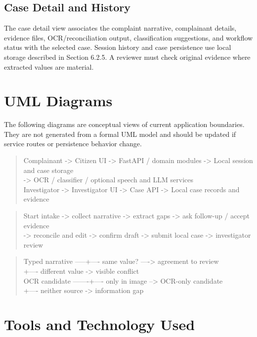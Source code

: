 \documentclass[12pt,a4paper,oneside]{report}
\begin{document}
\subsection{Case Detail and History}
The case detail view associates the complaint narrative, complainant details, evidence files, OCR/reconciliation output, classification suggestions, and workflow status with the selected case. Session history and case persistence use local storage described in Section 6.2.5. A reviewer must check original evidence where extracted values are material.\par\medskip
\section{UML Diagrams}
The following diagrams are conceptual views of current application boundaries. They are not generated from a formal UML model and should be updated if service routes or persistence behavior change.\par\medskip
{}
\begin{quote}\ttfamily\footnotesize Complainant -> Citizen UI -> FastAPI / domain modules -> Local session and case storage\\                         -> OCR / classifier / optional speech and LLM services\\Investigator -> Investigator UI -> Case API -> Local case records and evidence\end{quote}
\begin{quote}\ttfamily\footnotesize Start intake -> collect narrative -> extract gaps -> ask follow-up / accept evidence\\    -> reconcile and edit -> confirm draft -> submit local case -> investigator review\end{quote}
\begin{quote}\ttfamily\footnotesize Typed narrative -----+---- same value? ----> agreement to review\\                     +---- different value -> visible conflict\\OCR candidate -------+---- only in image --> OCR-only candidate\\                     +---- neither source -> information gap\end{quote}
\section{Tools and Technology Used}
\end{document}
